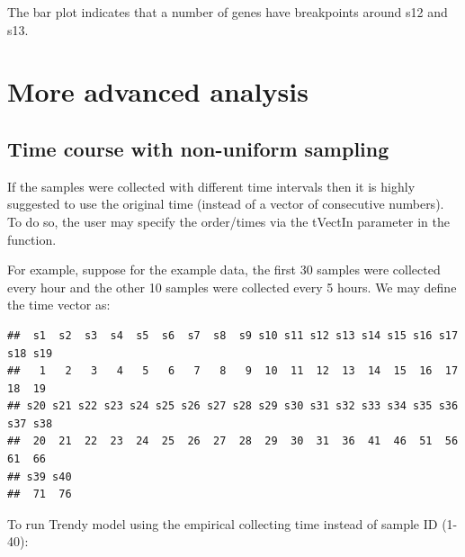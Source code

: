 \documentclass{article}
\begin{document}
The bar plot indicates that a number of genes have breakpoints around s12 and 
s13.

\section{More advanced analysis}

\subsection{Time course with non-uniform sampling}
If the samples were collected with different time intervals then it is highly 
suggested to
use the original time (instead of a vector of consecutive numbers). To do so,
the user may specify the order/times via the tVectIn parameter in the 
 function.

For example, suppose for the example data, the first 30 samples were collected
every hour and the other 10 samples were collected every 5 hours. We may 
define the time vector as:
\begin{knitrout}
\color{fgcolor}\begin{kframe}
\begin{alltt}
 \hlkwb{<-} \hlstd{(}\hlopt{:}\hlstd{,} \hlstd{(}\hlstd{,} \hlstd{,} \hlstd{))}
 \hlkwb{<-} 
\end{alltt}
\begin{verbatim}
##  s1  s2  s3  s4  s5  s6  s7  s8  s9 s10 s11 s12 s13 s14 s15 s16 s17 s18 s19 
##   1   2   3   4   5   6   7   8   9  10  11  12  13  14  15  16  17  18  19 
## s20 s21 s22 s23 s24 s25 s26 s27 s28 s29 s30 s31 s32 s33 s34 s35 s36 s37 s38 
##  20  21  22  23  24  25  26  27  28  29  30  31  36  41  46  51  56  61  66 
## s39 s40 
##  71  76
\end{verbatim}
\end{kframe}
\end{knitrout}

To run Trendy model using the empirical collecting time instead of sample 
ID (1-40):
\end{document}
